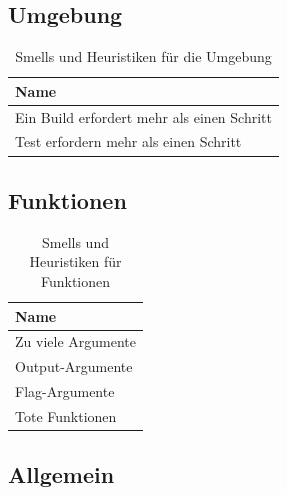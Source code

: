 \subsection{Umgebung}

\begin{table}[h]
	\centering
		 \begin{tabular}{ | l | }
		 \hline
			Name \\  \hline
			Ein Build erfordert mehr als einen Schritt \\
			Test erfordern mehr als einen Schritt \\ \hline
		\end{tabular}
	\caption{Smells und Heuristiken für die Umgebung}
	\label{tab:SmellsUndHeuristiken_Umgebung}
\end{table}

\subsection{Funktionen}

\begin{table}[h]
	\centering
		 \begin{tabular}{ | l | }
		 \hline
			Name \\  \hline
			Zu viele Argumente \\
			Output-Argumente \\
			Flag-Argumente \\
			Tote Funktionen \\ \hline
		\end{tabular}
	\caption{Smells und Heuristiken für Funktionen}
	\label{tab:SmellsUndHeuristiken_Functions}
\end{table}

\subsection{Allgemein}

